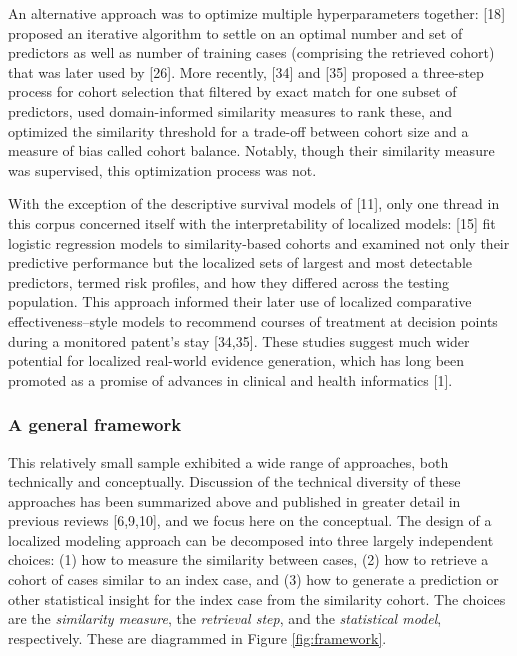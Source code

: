 \documentclass[preprint, 3p,
authoryear]{elsarticle} %
\begin{document}
An alternative approach was to optimize multiple hyperparameters
together: {[}18{]} proposed an iterative algorithm to settle on an
optimal number and set of predictors as well as number of training cases
(comprising the retrieved cohort) that was later used by {[}26{]}. More
recently, {[}34{]} and {[}35{]} proposed a three-step process for cohort
selection that filtered by exact match for one subset of predictors,
used domain-informed similarity measures to rank these, and optimized
the similarity threshold for a trade-off between cohort size and a
measure of bias called cohort balance. Notably, though their similarity
measure was supervised, this optimization process was not.

With the exception of the descriptive survival models of {[}11{]}, only
one thread in this corpus concerned itself with the interpretability of
localized models: {[}15{]} fit logistic regression models to
similarity-based cohorts and examined not only their predictive
performance but the localized sets of largest and most detectable
predictors, termed risk profiles, and how they differed across the
testing population. This approach informed their later use of localized
comparative effectiveness--style models to recommend courses of
treatment at decision points during a monitored patent's stay
{[}34,35{]}. These studies suggest much wider potential for localized
real-world evidence generation, which has long been promoted as a
promise of advances in clinical and health informatics {[}1{]}.

\hypertarget{a-general-framework}{%
\subsubsection{A general framework}\label{a-general-framework}}

This relatively small sample exhibited a wide range of approaches, both
technically and conceptually. Discussion of the technical diversity of
these approaches has been summarized above and published in greater
detail in previous reviews {[}6,9,10{]}, and we focus here on the
conceptual. The design of a localized modeling approach can be
decomposed into three largely independent choices: (1) how to measure
the similarity between cases, (2) how to retrieve a cohort of cases
similar to an index case, and (3) how to generate a prediction or other
statistical insight for the index case from the similarity cohort. The
choices are the \emph{similarity measure}, the \emph{retrieval step},
and the \emph{statistical model}, respectively. These are diagrammed in
Figure \ref{fig:framework}.
\end{document}
